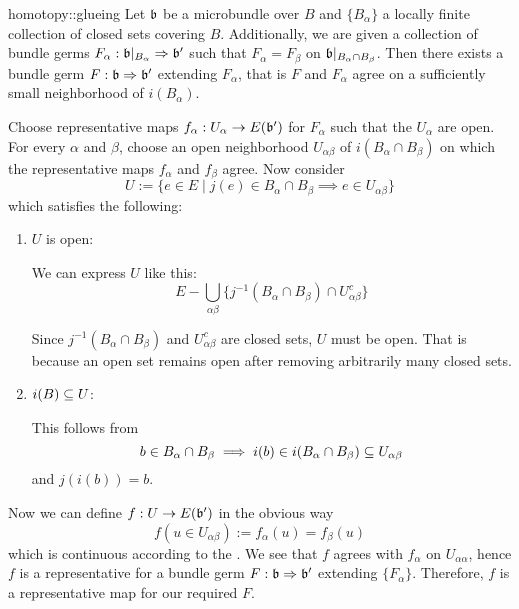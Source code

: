 \begin{mylemma}{homotopy::glueing}
    Let $\mathfrak{b}$ be a microbundle over $B$ and $\{B_\alpha\}$ a locally finite collection of closed sets covering $B$.
    Additionally, we are given a collection of bundle germs $F_\alpha: \mathfrak{b}\vert_{B_\alpha} \Rightarrow{} \mathfrak{b}'$
    such that $F_\alpha = F_\beta$ on $\mathfrak{b}\vert_{B_\alpha \cap B_\beta}$.
    Then there exists a bundle germ $F: \mathfrak{b} \Rightarrow{} \mathfrak{b}'$ extending $F_\alpha$,
    that is $F$ and $F_\alpha$ agree on a sufficiently small neighborhood of $i(B_\alpha)$.
\end{mylemma}
\begin{myproof}
    Choose representative maps $f_\alpha: U_\alpha \to E(\mathfrak{b}')$ for $F_\alpha$ such that the $U_\alpha$ are open.
    For every $\alpha$ and $\beta$, choose an open neighborhood $U_{\alpha\beta}$ of $i(B_\alpha \cap B_\beta)$ on which the representative maps $f_\alpha$ and $f_\beta$ agree.
    Now consider
    \[ U := \{ e \in E \mid j(e) \in B_\alpha \cap B_\beta \implies e \in U_{\alpha\beta} \}\]
    which satisfies the following:
    \begin{enumerate}
        \item $U$ is open:

        We can express $U$ like this:
        \[ E - \bigcup_{\alpha\beta} \{ j^{-1}(B_\alpha \cap B_\beta) \cap U_{\alpha\beta}^c \} \]
        
        Since $j^{-1}(B_\alpha \cap B_\beta)$ and $U_{\alpha\beta}^c$ are closed sets, $U$ must be open.
        That is because an open set remains open after removing arbitrarily many closed sets.
        \item $i(B) \subseteq{} U$:
        
        This follows from
        \[ b \in B_\alpha \cap B_\beta \implies i(b) \in i(B_\alpha \cap B_\beta) \subseteq{} U_{\alpha\beta} \]
        and $j(i(b)) = b$.
    \end{enumerate}
    Now we can define $f: U \to E(\mathfrak{b}')$ in the obvious way
    \[ f(u \in U_{\alpha\beta}) := f_\alpha(u) = f_\beta(u) \]
    which is continuous according to the .
    We see that $f$ agrees with $f_\alpha$ on $U_{\alpha\alpha}$,
    hence $f$ is a representative for a bundle germ $F: \mathfrak{b} \Rightarrow{}{} \mathfrak{b}'$ extending $\{F_\alpha\}$.
    Therefore, $f$ is a representative map for our required $F$.
\end{myproof}